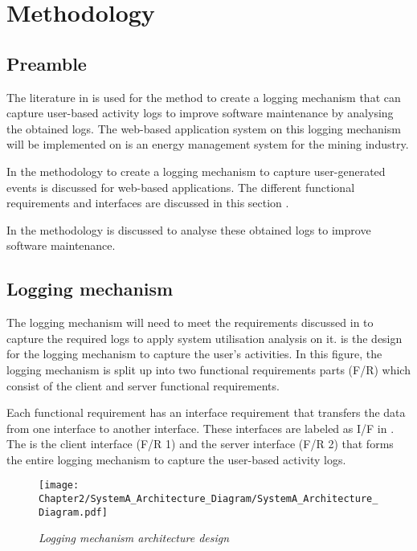 \chapter{Methodology}
\label{chap:2}

\section{Preamble} The literature in  is used for the method to create a logging mechanism that can capture user-based activity logs to improve software maintenance by analysing the obtained logs. The web-based application system on this logging mechanism will be implemented on is an energy management system for the mining industry.\par In  the methodology to create a logging mechanism to capture user-generated events is discussed for web-based applications. The different functional requirements and interfaces are discussed in this section \cite{Anish2015}.\par In  the methodology is discussed to analyse these obtained logs to improve software maintenance.

\section{Logging mechanism}\label{Ch2:LoggingMechanism} The logging mechanism will need to meet the requirements discussed in  to capture the required logs to apply system utilisation analysis on it.  is the design for the logging mechanism to capture the user's activities. In this figure, the logging mechanism is split up into two functional requirements parts (F/R) which consist of the client and server functional requirements.\par Each functional requirement has an interface requirement that transfers the data from one interface to another interface. These interfaces are labeled as I/F in . The  is the client interface (F/R 1) and the server interface (F/R 2) that forms the entire logging mechanism to capture the user-based activity logs.

\begin{figure}[!htb] %
	\centering %
	\texttt{[image: Chapter2/SystemA\_Architecture\_Diagram/SystemA\_Architecture\_Diagram.pdf]}
	\caption[Logging mechanism architecture design]
	{\textit{Logging mechanism architecture design}}\label{fig:ch2:systemDesign}
\end{figure}

